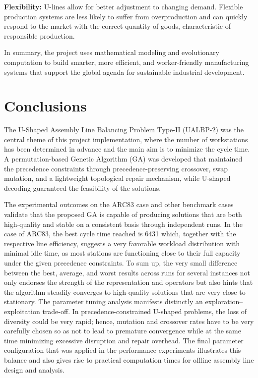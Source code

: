 \documentclass[12pt,a4paper]{article}
\begin{document}
\noindent\textbf{Flexibility:} U-lines allow for better adjustment to changing demand. Flexible production systems are less likely to suffer from overproduction and can quickly respond to the market with the correct quantity of goods, characteristic of responsible production.

\bigskip

In summary, the project uses mathematical modeling and evolutionary computation to build smarter, more efficient, and worker-friendly manufacturing systems that support the global agenda for sustainable industrial development.




\newpage
\section{Conclusions}
The U-Shaped Assembly Line Balancing Problem Type-II (UALBP-2) was the central theme of this project implementation, where the number of workstations has been determined in advance and the main aim is to minimize the cycle time. A permutation-based Genetic Algorithm (GA) was developed that maintained the precedence constraints through precedence-preserving crossover, swap mutation, and a lightweight topological repair mechanism, while U-shaped decoding guaranteed the feasibility of the solutions.

The experimental outcomes on the ARC83 case and other benchmark cases validate that the proposed GA is capable of producing solutions that are both high-quality and stable on a consistent basis through independent runs. In the case of ARC83, the best cycle time reached is 6431 which, together with the respective line efficiency, suggests a very favorable workload distribution with minimal idle time, as most stations are functioning close to their full capacity under the given precedence constraints. To sum up, the very small difference between the best, average, and worst results across runs for several instances not only endorses the strength of the representation and operators but also hints that the algorithm steadily converges to high-quality solutions that are very close to stationary.
The parameter tuning analysis manifests distinctly an exploration–exploitation trade-off. In precedence-constrained U-shaped problems, the loss of diversity could be very rapid; hence, mutation and crossover rates have to be very carefully chosen so as not to lead to premature convergence while at the same time minimizing excessive disruption and repair overhead. The final parameter configuration that was applied in the performance experiments illustrates this balance and also gives rise to practical computation times for offline assembly line design and analysis.
\end{document}
